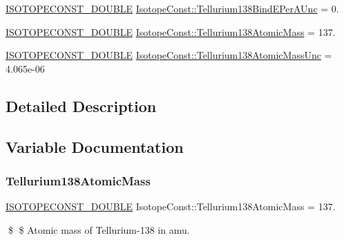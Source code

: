 \begin{DoxyCompactItemize}
\mbox{\hyperlink{group___isotope_const-_macros_ga8f45a7272ce02c0b4c65c44636ed719a}{I\+S\+O\+T\+O\+P\+E\+C\+O\+N\+S\+T\+\_\+\+D\+O\+U\+B\+LE}} \mbox{\hyperlink{group___isotope_const-_tellurium-_te138_gafb37762b3ab9225b9cd86a6ef59097c2}{Isotope\+Const\+::\+Tellurium138\+Bind\+E\+Per\+A\+Unc}} = 0.
\item 
\mbox{\hyperlink{group___isotope_const-_macros_ga8f45a7272ce02c0b4c65c44636ed719a}{I\+S\+O\+T\+O\+P\+E\+C\+O\+N\+S\+T\+\_\+\+D\+O\+U\+B\+LE}} \mbox{\hyperlink{group___isotope_const-_tellurium-_te138_ga8dc562cdc83d42a53947addd5a495a2b}{Isotope\+Const\+::\+Tellurium138\+Atomic\+Mass}} = 137.
\item 
\mbox{\hyperlink{group___isotope_const-_macros_ga8f45a7272ce02c0b4c65c44636ed719a}{I\+S\+O\+T\+O\+P\+E\+C\+O\+N\+S\+T\+\_\+\+D\+O\+U\+B\+LE}} \mbox{\hyperlink{group___isotope_const-_tellurium-_te138_gaca794f046d455e7ca8444dc5bbaeef44}{Isotope\+Const\+::\+Tellurium138\+Atomic\+Mass\+Unc}} = 4.\+065e-\/06
\end{DoxyCompactItemize}


\subsection{Detailed Description}


\subsection{Variable Documentation}
\mbox{\label{group___isotope_const-_tellurium-_te138_ga8dc562cdc83d42a53947addd5a495a2b}} 
\subsubsection{\texorpdfstring{Tellurium138\+Atomic\+Mass}{Tellurium138AtomicMass}}
{\footnotesize\ttfamily \mbox{\hyperlink{group___isotope_const-_macros_ga8f45a7272ce02c0b4c65c44636ed719a}{I\+S\+O\+T\+O\+P\+E\+C\+O\+N\+S\+T\+\_\+\+D\+O\+U\+B\+LE}} Isotope\+Const\+::\+Tellurium138\+Atomic\+Mass = 137.}

\$ \$ Atomic mass of Tellurium-\/138 in amu. \mbox{\label{group___isotope_const-_tellurium-_te138_gaca794f046d455e7ca8444dc5bbaeef44}} 
